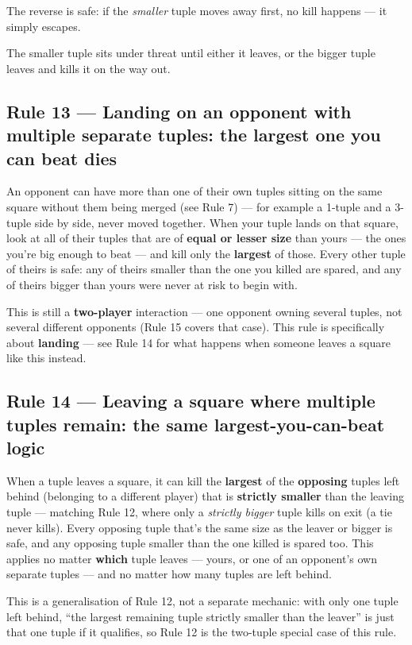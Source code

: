\documentclass[10pt,a4paper]{article}
\newcommand{\ruletitle}[2]{\subsection*{Rule #1 --- #2}}
\begin{document}
The reverse is safe: if the \emph{smaller} tuple moves away first, no kill
happens --- it simply escapes.

\begin{center}
  
\end{center}

The smaller tuple sits under
threat until either it leaves, or the bigger tuple leaves and kills it on the
way out.

\ruletitle{13}{Landing on an opponent with multiple separate tuples: the largest one you can beat dies}

An opponent can have more than one of their own tuples sitting on the same
square without them being merged (see Rule 7) --- for example a 1-tuple and
a 3-tuple side by side, never moved together. When your tuple lands on that
square, look at all of their tuples that are of \textbf{equal or lesser
size} than yours --- the ones you're big enough to beat --- and kill only
the \textbf{largest} of those. Every other tuple of theirs is safe: any of
theirs smaller than the one you killed are spared, and any of theirs bigger
than yours were never at risk to begin with.

\begin{center}
  
\end{center}

This is still a \textbf{two-player} interaction --- one opponent owning
several tuples, not several different opponents (Rule 15 covers that case).
This rule is specifically about \textbf{landing} --- see Rule 14 for what
happens when someone leaves a square like this instead.

\ruletitle{14}{Leaving a square where multiple tuples remain: the same largest-you-can-beat logic}

When a tuple leaves a square, it can kill the \textbf{largest} of the
\textbf{opposing} tuples left behind (belonging to a different player) that
is \textbf{strictly smaller} than the leaving tuple --- matching Rule 12,
where only a \emph{strictly bigger} tuple kills on exit (a tie never
kills). Every opposing tuple that's the same size as the leaver or bigger
is safe, and any opposing tuple smaller than the one killed is spared too.
This applies no matter \textbf{which} tuple leaves --- yours, or one of an
opponent's own separate tuples --- and no matter how many tuples are left
behind.

This is a generalisation of Rule 12, not a separate mechanic: with only one
tuple left behind, ``the largest remaining tuple strictly smaller than the
leaver'' is just that one tuple if it qualifies, so Rule 12 is the
two-tuple special case of this rule.
\end{document}
